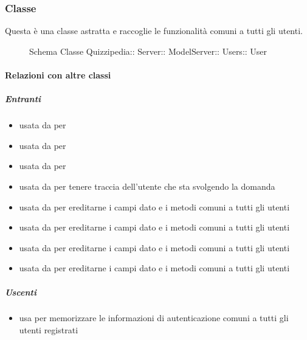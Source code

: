\subsubsection{Classe }
Questa è una classe astratta e raccoglie le funzionalità comuni a tutti gli utenti.
\begin{figure}[H]
\centering
\noindent{}
\caption[Schema Classe User]{Schema Classe Quizzipedia:: Server:: ModelServer:: Users:: User}
\end{figure}
\paragraph{Relazioni con altre classi}
\subparagraph{Entranti}
\begin{itemize}
\item usata da  per 
\item usata da  per 
\item usata da  per 
\item usata da  per tenere traccia dell'utente che sta svolgendo la domanda
\item usata da  per ereditarne i campi dato e i metodi comuni a tutti gli utenti
\item usata da  per ereditarne i campi dato e i metodi comuni a tutti gli utenti
\item usata da  per ereditarne i campi dato e i metodi comuni a tutti gli utenti
\item usata da  per ereditarne i campi dato e i metodi comuni a tutti gli utenti
\end{itemize}
\subparagraph{Uscenti}
\begin{itemize}
\item usa  per memorizzare le informazioni di autenticazione comuni a tutti gli utenti registrati
\end{itemize}
